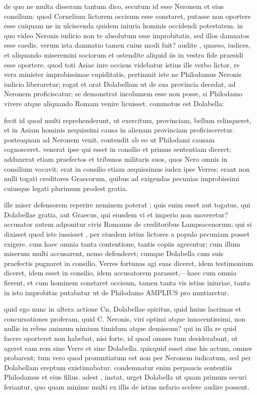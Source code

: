  de quo ne multa disseram tantum dico, secutum id esse Neronem et eius consilium: quod Cornelium lictorem occisum esse constaret, putasse non oportere esse cuiquam ne in ulciscenda quidem iniuria hominis occidendi potestatem. in quo video Neronis iudicio non te absolutum esse improbitatis, sed illos damnatos esse caedis. verum ista damnatio tamen cuius modi fuit? audite , quaeso, iudices, et aliquando miseremini sociorum et ostendite aliquid iis in vestra fide praesidi esse oportere. quod toti Asiae iure occisus videbatur istius ille verbo lictor, re vera minister improbissimae cupiditatis, pertimuit iste ne Philodamus Neronis iudicio liberaretur; rogat et orat Dolabellam ut de sua provincia decedat, ad Neronem proficiscatur; se demonstrat incolumem esse non posse, si Philodamo vivere atque aliquando Romam venire licuisset. commotus est Dolabella:

 fecit id quod multi reprehenderunt, ut exercitum, provinciam, bellum relinqueret, et in Asiam hominis nequissimi causa in alienam provinciam proficisceretur. posteaquam ad Neronem venit, contendit ab eo ut Philodami causam cognosceret. venerat ipse qui esset in consilio et primus sententiam diceret; adduxerat etiam praefectos et tribunos militaris suos, quos Nero omnis in consilium vocavit; erat in consilio etiam aequissimus iudex ipse Verres; erant non nulli togati creditores Graecorum, quibus ad exigendas pecunias improbissimi cuiusque legati plurimum prodest gratia.

 ille miser defensorem reperire neminem poterat ; quis enim esset aut togatus, qui Dolabellae gratia, aut Graecus, qui eiusdem vi et imperio non moveretur? accusator autem adponitur civis Romanus de creditoribus Lampsacenorum; qui si dixisset quod iste iussisset , per eiusdem istius lictores a populo pecuniam posset exigere. cum haec omnia tanta contentione, tantis copiis agerentur; cum illum miserum multi accusarent, nemo defenderet; cumque Dolabella cum suis praefectis pugnaret in consilio, Verres fortunas agi suas diceret, idem testimonium diceret, idem esset in consilio, idem accusatorem parasset,—haec cum omnia fierent, et cum hominem constaret occisum, tamen tanta vis istius iniuriae, tanta in isto improbitas putabatur ut de Philodamo AMPLIUS pro nuntiaretur.

 quid ego nunc in altera actione Cn. Dolabellae spiritus, quid huius lacrimas et concursationes proferam, quid C. Neronis, viri optimi atque innocentissimi, non nullis in rebus animum nimium timidum atque demissum? qui in illa re quid facere oporteret non habebat, nisi forte, id quod omnes tum desiderabant, ut ageret eam rem sine Verre et sine Dolabella. quicquid esset sine his actum, omnes probarent; tum vero quod pronuntiatum est non per Neronem iudicatum, sed per Dolabellam ereptum existimabatur. condemnatur enim perpaucis sententiis Philodamus et eius filius. adest , instat, urget Dolabella ut quam primum securi feriantur, quo quam minime multi ex illis de istius nefario scelere audire possent.

